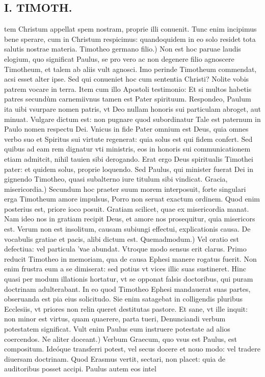 \documentclass{article}
\begin{document}
\begin{pages}
\section*{I. TIMOTH. }
\marginpar{[ p.2 ]}\pstart tem Christum appellat spem nostram, proprie illi conuenit. Tunc enim incipimus bene sperare, cum in Christum respicimus: quandoquidem in eo solo residet tota salutis nostrae materia.  \pend\pstart Timotheo germano filio.) Non est hoc paruae laudis elogium, quo significat Paulus, se pro vero ac non degenere filio agnoscere Timotheum, et talem ab aliis vult agnosci. Imo perinde Timotheum commendat, acsi esset alter ipse. Sed qui conueniet hoc cum sententia Christi? Nolite vobis patrem vocare in terra. Item cum illo Apostoli testimonio: Et si multos habetis patres secundùm carnemiivnus tamen est Pater spirituum. Respondeo, Paulum ita uibi vsurpare nomen patris, vt Deo nullam honoris sui particulam abroget, aut minuat. Vulgare dictum est: non pugnare quod subordinatur Tale est paternum in Paulo nomen respectu Dei. Vnicus in fide Pater omnium est Deus, quia omnes verbo suo et Spiritus sui virtute regenerat: quia solus est qui fidem confert. Sed quibus ad eam rem dignatur vti ministris, eos in honoris sui communicationem etiam admitcit, nihil tauien sibi derogando. Erat ergo Deus spiritualis Timothei pater: et quidem solus, proprie loquendo. Sed Paulus, qui minister fuerat Dei in gignendo Timotheo, quasi subalterno iure titulum sibi vindicat.  \pend\pstart Gracia, misericordia.) Secundum hoc praeter suum morem interposuit, forte singulari erga Timotheum amore impulsus, Porro non seruat exactum ordinem. Quod enim posterius est, priore ioco posuit. Gratiam scilicet, quae ex misericordia manat. Nam ideo nos in gratiam recipit Deus, et amore nos prosequitur, quia misericors est. Verum non est insolitum, causam subiungi effectui, explicationis causa. De vocabulis gratiae et pacis, alibi dictum est.  \pend\pstart Quemadmodum.) Vel oratio est defectiua: vel particula 'νae abundat. Vtroque modo sensus erit clarus. Primo reducit Timotheo in memoriam, qua de causa Ephesi manere rogatus fuerit. Non enim frustra eum a se dimiserat: sed potius vt vices illic suas sustineret. Hinc quasi per modum illationis hortatur, vt se opponat falsis doctoribus, qui puram doctrinam adulterabant. In eo quod Timotheo Ephesi mandauerat suas partes, obseruanda est pia eius solicitudo. Sie enim satagebat in colligendis pluribus Ecclesiis, vt priores non relin queret destitutas pastore. Et sane, vt ille inquit: non minor est virtus, quam quaerere, parta tueri, Denunciandi verbum potestatem significat. Vult enim Paulus eum instruere potestate ad alios coercendos. Ne aliter doceant.) Verbum Graecum, quo vsus est Paulus, est compositum. Ideóque transferri potest, vel secus docere et nouo modo: vel tradere diuersam doctrinam. Quod Erasmus vertit, sectari, non placet: quia de auditoribus posset accipi. Paulus autem eos intel  \pend

\end{pages}
\end{document}
